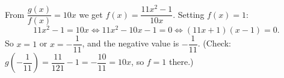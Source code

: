 From $\dfrac{g(x)}{f(x)}=10x$ we get $f(x)=\dfrac{11x^2-1}{10x}$. Setting $f(x)=1$:
\[
11x^2-1=10x\iff11x^2-10x-1=0\iff(11x+1)(x-1)=0 .
\]
So $x=1$ or $x=-\dfrac{1}{11}$, and the negative value is $\boxed{-\dfrac{1}{11}}$. (Check: $g\left(-\dfrac{1}{11}\right)=\dfrac{11}{121}-1=-\dfrac{10}{11}=10x$, so $f=1$ there.)
